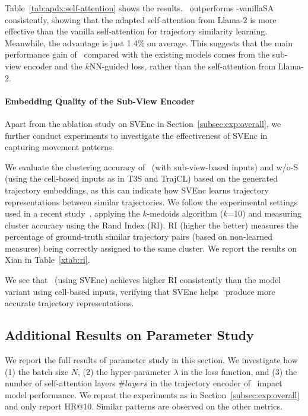 

Table~\ref{tab:apdx:self-attention} shows the results. 
\model\ outperforms \model-vanillaSA consistently, showing that the adapted self-attention from Llama-2 is more effective than the vanilla self-attention for trajectory similarity learning. Meanwhile, the advantage is just 1.4\% on average. This suggests that the main performance gain of \model\ compared with the existing models comes from the sub-view encoder and the $k$NN-guided loss, rather than the self-attention from Llama-2.


\paragraph{Embedding Quality of the Sub-View Encoder}

Apart from the ablation study on SVEnc in Section~\ref{subsec:exp:overall}, we further conduct experiments to investigate the  effectiveness of SVEnc in capturing movement patterns. 

We evaluate the clustering accuracy of \model\ (with sub-view-based inputs) and \model\-w/o-S (using the cell-based inputs as in T3S and TrajCL) based on the generated trajectory embeddings, as this can indicate how SVEnc learns trajectory representations between similar trajectories.
We follow the experimental settings used in a recent study~\cite{trajsimi_survey}, applying the $k$-medoids algorithm ($k$=10) and measuring cluster accuracy using the Rand Index (RI). RI (higher the better) measures the percentage of ground-truth similar trajectory pairs (based on non-learned measures) being correctly assigned to the same cluster. We report the results on Xian in Table~\ref{xtab:ri}.

We see that \model\ (using SVEnc) achieves higher RI consistently than the model variant using cell-based inputs, verifying that SVEnc helps \model\ produce more accurate trajectory representations.

\subsection{Additional Results on Parameter Study}\label{app:parameterstudy}

We report the full results of parameter study in this section.
We investigate how (1) the batch size $N$, (2) the hyper-parameter $\lambda$ in the loss function, and (3) the number of self-attention layers $\#layers$ in the trajectory encoder of \model\ impact model performance. We repeat the experiments as in Section~\ref{subsec:exp:overall} and only report HR@10. Similar patterns are observed on the other metrics. 

